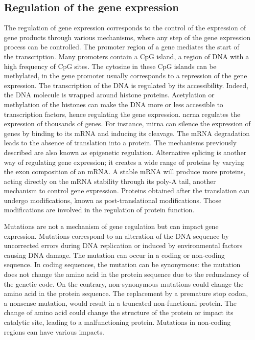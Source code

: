 \documentclass[../main.tex]{subfiles}
\begin{document}
 \subsection{Regulation of the gene expression}\label{subsec:gene_regulation}
	 The regulation of gene expression corresponds to the control of the expression of gene products through various mechanisms,
	 where any step of the gene expression process can be controlled.
	 The promoter region of a gene mediates the start of the transcription.
	 Many promoters contain a CpG island, a region of DNA with a high frequency of CpG sites.
	 The cytosine in these CpG islands can be methylated,  in the gene promoter usually corresponds to a repression of the gene expression.
	 The transcription of the DNA is regulated by its accessibility.
	 Indeed, the DNA molecule is wrapped around histone proteins.
	 Acetylation or methylation of the histones can make the DNA more or less accessible to transcription factors, hence regulating the gene expression.
	 \Gls{ncrna} regulates the expression of thousands of genes.
	 For instance, \gls{mirna} can silence the expression of genes by binding to its mRNA and inducing its cleavage.
	 The mRNA degradation leads to the absence of translation into a protein.
	 The mechanisms previously described are also known as epigenetic regulation.
	 Alternative splicing is another way of regulating gene expression; it creates a wide range of proteins by varying the exon composition of an mRNA\@.
	 A stable mRNA will produce more proteins, acting directly on the mRNA stability through its poly-A tail, another mechanism to control gene expression.
	 Proteins obtained after the translation can undergo modifications, known as post-translational modifications.
	 Those modifications are involved in the regulation of protein function.

	 Mutations are not a mechanism of gene regulation but can impact gene expression.
	 Mutations correspond to an alteration of the DNA sequence by uncorrected errors during DNA replication or induced by environmental factors causing DNA damage.
	 The mutation can occur in a coding or non-coding sequence.
	 In coding sequences, the mutation can be synonymous: the mutation does not change the amino acid in the protein sequence due to the redundancy of the genetic code.
	 On the contrary, non-synonymous mutations could change the amino acid in the protein sequence.
	 The replacement by a premature stop codon, a nonsense mutation, would result in a truncated non-functional protein.
	 The change of amino acid could change the structure of the protein or impact its catalytic site, leading to a malfunctioning protein.
	 Mutations in non-coding regions can have various impacts.
\end{document}
